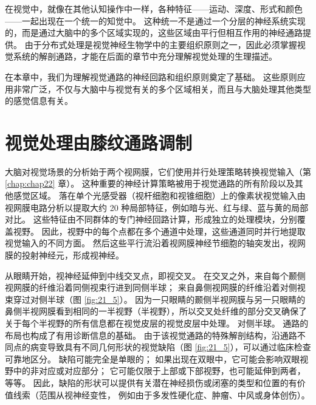在视觉中，就像在其他认知操作中一样，各种特征——运动、深度、形式和颜色——一起出现在一个统一的知觉中。
这种统一不是通过一个分层的神经系统实现的，而是通过大脑中的多个区域实现的，这些区域由平行但相互作用的神经通路提供。 
由于分布式处理是视觉神经生物学中的主要组织原则之一，因此必须掌握视觉系统的解剖通路，才能在后面的章节中充分理解视觉处理的生理描述。


在本章中，我们为理解视觉通路的神经回路和组织原则奠定了基础。 
这些原则应用非常广泛，不仅与大脑中与视觉有关的多个区域相关，而且与大脑处理其他类型的感觉信息有关。



\section{视觉处理由膝纹通路调制}
大脑对视觉场景的分析始于两个视网膜，它们使用并行处理策略转换视觉输入（第 \ref{chap:chap22} 章）。 
这种重要的神经计算策略被用于视觉通路的所有阶段以及其他感觉区域。 
落在单个光感受器（视杆细胞和视锥细胞）上的像素状视觉输入由视网膜电路分析以提取大约 20 种局部特征，例如暗与光、红与绿、蓝与黄的局部对比。 
这些特征由不同群体的专门神经回路计算，形成独立的处理模块，分别覆盖视野。 
因此，视野中的每个点都在多个通道中处理，这些通道同时并行地提取视觉输入的不同方面。 
然后这些平行流沿着视网膜神经节细胞的轴突发出，视网膜的投射神经元，形成视神经。


从眼睛开始，视神经延伸到中线交叉点，即视交叉。
在交叉之外，来自每个颞侧视网膜的纤维沿着同侧视束行进到同侧半球；
来自鼻侧视网膜的纤维沿着对侧视束穿过对侧半球（图 \ref{fig:21_5}）。 
因为一只眼睛的颞侧半视网膜与另一只眼睛的鼻侧半视网膜看到相同的一半视野（半视野），所以交叉处纤维的部分交叉确保了关于每个半视野的所有信息都在视觉皮层的视觉皮层中处理。 对侧半球。 
通路的布局也构成了有用诊断信息的基础。 
由于该视觉通路的特殊解剖结构，沿通路不同点的病变导致具有不同几何形状的视觉缺陷（图 \ref{fig:21_5}），可以通过临床检查可靠地区分。 
缺陷可能完全是单眼的； 如果出现在双眼中，它可能会影响双眼视野中的非对应或对应部分； 
它可能仅限于上部或下部视野，也可能延伸到两者，等等。
因此，缺陷的形状可以提供有关潜在神经损伤或闭塞的类型和位置的有价值线索（范围从视神经变性， 例如由于多发性硬化症、肿瘤、中风或身体创伤）。


